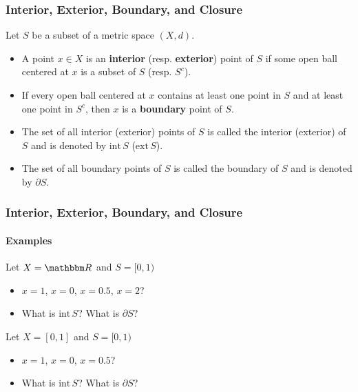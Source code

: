 \documentclass[9pt,aspectratio=169]{beamer}
\newcommand{\RR}{\mathbbm R}
\newcommand{\interior}{\text{int}\,}
\begin{document}
\begin{frame}
    \frametitle{Interior, Exterior, Boundary, and Closure}
    \begin{definition}
        Let $S$ be a subset of a metric space $(X, d)$.
        \begin{itemize}
            \item A point $x \in X$ is an \textbf{interior} (resp.
            \textbf{exterior}) point of $S$ if some open ball centered at $x$
            is a subset of $S$ (resp. $S^c$).
            \item If every open ball centered at $x$ contains at least one
            point in $S$ and at least one point in $S^c$, then $x$ is a
            \textbf{boundary} point of $S$.
            \item The set of all interior (exterior) points of $S$ is called
            the interior (exterior) of $S$ and is denoted by $\interior S$
            ($\text{ext}\,S$).
            \item The set of all boundary points of $S$ is called the
            boundary of $S$ and is denoted by $\partial S$.
        \end{itemize}
    \end{definition}
\end{frame}

\begin{frame}
    \frametitle{Interior, Exterior, Boundary, and Closure}
    \framesubtitle{Examples}
    Let $X = \RR$ and $S = [0, 1)$
    \begin{itemize}
        \item $x = 1$, $x = 0$, $x = 0.5$, $x = 2$?
        \item What is $\interior S$? What is $\partial S$?
    \end{itemize}
    Let $X = [0, 1]$ and $S = [0, 1)$
    \begin{itemize}
        \item $x = 1$, $x = 0$, $x = 0.5$?
        \item What is $\interior S$? What is $\partial S$?
    \end{itemize}
\end{frame}
\end{document}
